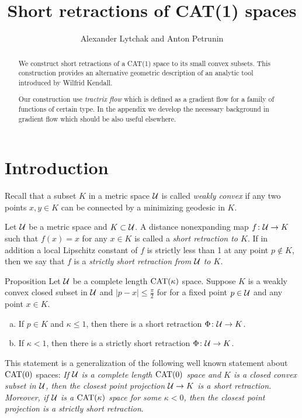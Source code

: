 \documentclass[oneside,a4paper, 12pt]{article}
\begin{document}
\title{Short retractions of CAT(1) spaces}
\author{Alexander Lytchak and Anton Petrunin}
\date{}
\maketitle

\begin{abstract}
We construct short retractions of a CAT(1) space to its small convex subsets.
This construction provides an alternative geometric description of an analytic tool introduced by Wilfrid Kendall.

Our construction use \emph{tractrix flow} which is defined as a gradient flow for a family of functions of certain type.
In the appendix we develop the necessary background in gradient flow which should be also useful elsewhere.
\end{abstract}


\section{Introduction}

Recall that a  subset $K$ in a metric space ${\mathcal{U}}$ is called \emph{weakly convex} if any two points $x,y\in K$ can be connected by a minimizing geodesic in $K$.

Let ${\mathcal{U}}$ be a metric space and $K\subset {\mathcal{U}}$.
A distance nonexpanding map $f\colon{\mathcal{U}}\to K$ such that $f(x)=x$ for any $x\in K$ is called a \emph{short retraction to $K$}.
If in addition a local Lipschitz constant of $f$ is strictly less than 1 at any point $p\notin K$, 
then we say that $f$ is a \emph{strictly short retraction from ${\mathcal{U}}$ to $K$}.

\begin{thm}{Proposition}\label{thm:retraction:Phi}
Let $\mathcal{U}$ be a complete length $\mathrm{CAT}(\kappa)$ space.
Suppose $K$ is a weakly convex closed subset in $\mathcal{U}$ and $|p-x|\le \tfrac\pi2$ for for a fixed point $p\in \mathcal{U}$ and any point $x\in K$.


\begin{enumerate}[(a)]
 \item If $p\in K$ and $\kappa\le 1$, then there is a short retraction 
$\Phi\colon\mathcal{U}\to K$.
\item If $\kappa<1$, then there is a strictly short retraction 
$\Phi\colon\mathcal{U}\to K$.
\end{enumerate}
\end{thm}

This statement is a generalization of the following well known statement about $\mathrm{CAT}(0)$ spaces:
\emph{If ${\mathcal{U}}$ is a complete length $\mathrm{CAT}(0)$ space and $K$ is a closed convex subset in ${\mathcal{U}}$,
then the closest point projection ${\mathcal{U}}\to K$ is a short retraction.
Moreover, if $\mathcal{U}$ is a $\mathrm{CAT}(\kappa)$ space for some $\kappa<0$, then  the closest point projection is a strictly short retraction}.
\end{document}
